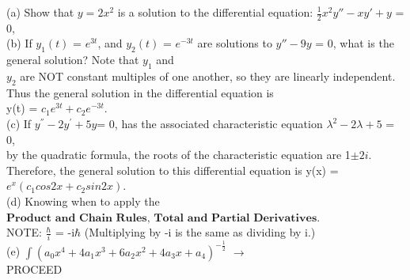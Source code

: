 \documentclass[a4paper, 10pt, onepage]{elegantbook}
\begin{document}

(a) Show that $y = 2x^2$ is a solution to the differential equation: $\frac{1}{2}x^2y''-xy'+y$ = 0, \\

(b) If $y_1(t)$ = $e^{3t}$, and $y_2(t)$ = $e^{-3t}$ are solutions to $y'' - 9y$ = 0, what is the general solution? Note that $y_1$ and  \\
$y_2$ are NOT constant multiples of one another, so they are linearly independent. Thus the general solution in the differential equation is  \\
y(t) = $c_1e^{3t} + c_2e^{-3t}$. \\

(c) If $y^{''} - 2y^{'} + 5y $= 0, has the associated characteristic equation $\lambda^2 - 2\lambda + 5$ = 0,  \\
by the quadratic formula, the roots of the characteristic equation are 1$\pm 2{i}$.
Therefore, the general solution to this differential equation is y(x) = $e^x(c_1cos2{x}+c_2sin2{x})$.  \\

(d) Knowing when to apply the $\mathbf{\textbf{Product and Chain Rules, Total and Partial Derivatives}}$.  \\

NOTE: $\frac{\hbar}{i}$ = -i$\hbar$ (Multiplying by -i is the same as dividing by i.)  \\

(e) $\int (a_0 x^4 + 4a_1 x^3 + 6a_2 x^2 + 4a_3 x + a_4)^{- \frac{1}{2}}$ $\rightarrow$  \\




PROCEED  \\

\end{document}
